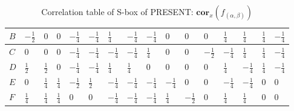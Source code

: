 \begin{table}
\begin{tiny}
\begin{tabular}{|l|l|l|l|l|l|l|l|l|l|l|l|l|l|l|l|}
$B$&$-\frac{1}{2}$&$0$&$0$&$-\frac{1}{4}$&$-\frac{1}{4}$&$\frac{1}{4}$&$-\frac{1}{4}$&$-\frac{1}{4}$&$0$&$0$&$0$&$\frac{1}{4}$&$\frac{1}{4}$&$\frac{1}{4}$& $-\frac{1}{4}$  \\ \hline
$C$&$0$&$0$&$0$&$-\frac{1}{4}$&$-\frac{1}{4}$&$-\frac{1}{4}$&$-\frac{1}{4}$&$\frac{1}{4}$&$0$&$0$&$-\frac{1}{2}$&$-\frac{1}{4}$&$\frac{1}{4}$&$\frac{1}{4}$&$-\frac{1}{4}$  \\ \hline
$D$&$\frac{1}{2}$&$\frac{1}{2}$&$0$&$-\frac{1}{4}$&$-\frac{1}{4}$&$\frac{1}{4}$&$\frac{1}{4}$&$0$&$0$&$0$&$0$&$\frac{1}{4}$&$-\frac{1}{4}$&$\frac{1}{4}$&$-\frac{1}{4}$  \\ \hline
$E$&$0$&$\frac{1}{4}$&$\frac{1}{4}$&$-\frac{1}{2}$&$\frac{1}{2}$&$-\frac{1}{4}$&$-\frac{1}{4}$&$-\frac{1}{4}$&$-\frac{1}{4}$&$0$&$0$&$-\frac{1}{4}$&$-\frac{1}{4}$&$0$&$0$\\ \hline
$F$&$\frac{1}{4}$&$\frac{1}{4}$&$\frac{1}{4}$&$0$&$0$&$-\frac{1}{4}$&$-\frac{1}{4}$&$-\frac{1}{4}$&$\frac{1}{4}$&$-\frac{1}{2}$&$0$&$\frac{1}{4}$&$\frac{1}{4}$&$0$&$0$  \\ \hline
\end{tabular}
\end{tiny}
\caption{Correlation table of S-box of PRESENT: $\mathbf{cor}_x\left(f_{\left( \alpha, \beta \right)} \right)$}
\label{table:correlation_matrix}
\end{table} 


